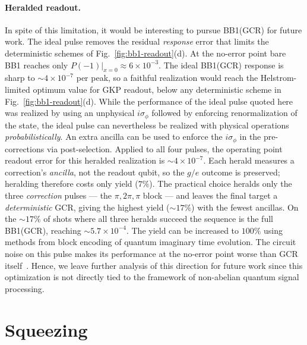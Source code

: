 \documentclass[aps,prx,showpacs,notitlepage,twocolumn,superscriptaddress,nofootinbib,preprintnumbers,floatfix,10pt, longbibliography]{revtex4-2}
\begin{document}
{\paragraph{Heralded readout.}  In spite of this limitation, it would be interesting to pursue BB1(GCR) for future work. The ideal pulse removes the residual \emph{response} error that limits the deterministic schemes of
Fig.~\ref{fig:bb1-readout}(d). At the no-error point bare BB1 reaches only
$P(-1)|_{x=0}\approx 6\times10^{-3}$. The ideal BB1(GCR)
response is sharp to $\sim\!4\times10^{-7}$ per peak, so a faithful realization would reach the Helstrom-limited optimum value for GKP readout, below any deterministic scheme in Fig.~\ref{fig:bb1-readout}(d). While the performance of the ideal pulse quoted here was realized by using an unphysical $i\sigma_\phi$ followed by enforcing renormalization of the state, the ideal pulse can nevertheless be realized with physical operations \emph{probabilistically}. An extra ancilla can be used to enforce the $i\sigma_\phi$ in the pre-corrections via post-selection. Applied to all four pulses, the operating point readout error for this heralded realization is $\sim\!4\times10^{-7}$. Each herald measures a correction's \emph{ancilla},
not the readout qubit, so the $g/e$ outcome is preserved; heralding therefore costs only yield ($7\%$). The practical choice heralds only the three \emph{correction} pulses
--- the $\pi,2\pi,\pi$ block --- and leaves the final target a \emph{deterministic} GCR, giving the
highest yield ($\sim\!17\%$) with the fewest ancillas. On the $\sim\!17\%$ of shots where all three
heralds succeed the sequence is the full BB1(GCR), reaching $\sim\!5.7\times10^{-4}$. The yield can be increased to $100\%$ using methods from block encoding of quantum imaginary time evolution. The circuit noise on this pulse makes its performance at the no-error point worse than GCR itself~\cite{singh_shraggybb1gcr_simulations_2026}. Hence, we leave further analysis of this direction for future work since this optimization is not directly tied to the framework of non-abelian quantum signal processing.

\section{Squeezing}\label{app:squeezing}

}
\end{document}
